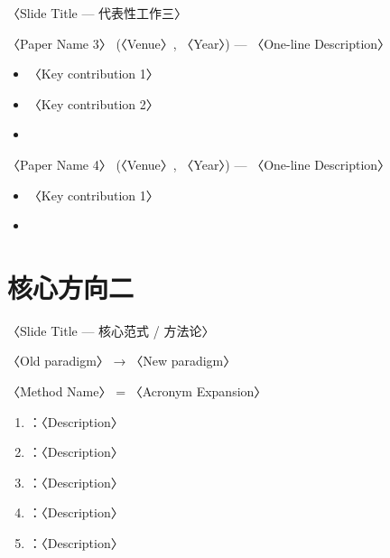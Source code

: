 \begin{frame}{〈Slide Title — 代表性工作三〉}
  \begin{block}{〈Paper Name 3〉 (〈Venue〉, 〈Year〉) — 〈One-line Description〉}
    \begin{itemize}
      \item 〈Key contribution 1〉
      \item 〈Key contribution 2〉
      \item {}
    \end{itemize}
  \end{block}
  \tightgap
  \begin{block}{〈Paper Name 4〉 (〈Venue〉, 〈Year〉) — 〈One-line Description〉}
    \begin{itemize}
      \item 〈Key contribution 1〉
      \item {}
    \end{itemize}
  \end{block}
\end{frame}

\renewcommand{\secblurb}{〈本节一句话主旨：第二个核心方向的贡献与突破〉}
\section{核心方向二}

\begin{frame}{〈Slide Title — 核心范式 / 方法论〉}
  \begin{callout}[核心范式转变]
    〈Old paradigm〉 → 〈New paradigm〉
  \end{callout}
  \tightgap
  \begin{block}{〈Method Name〉 = 〈Acronym Expansion〉}
    \begin{enumerate}
      \item {}：〈Description〉
      \item {}：〈Description〉
      \item {}：〈Description〉
      \item {}：〈Description〉
      \item {}：〈Description〉
    \end{enumerate}
  \end{block}
\end{frame}

